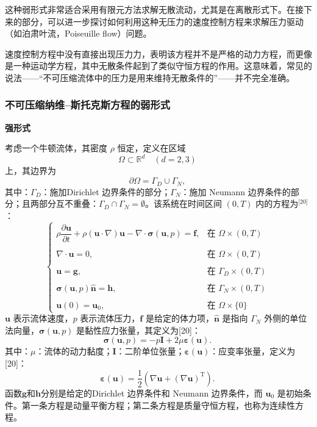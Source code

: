 这种弱形式非常适合采用有限元方法求解无散流动，尤其是在离散形式下。在接下来的部分，可以进一步探讨如何利用这种无压力的速度控制方程来求解压力驱动（如泊肃叶流，Poiseuille flow）问题。

速度控制方程中没有直接出现压力力，表明该方程并不是严格的动力方程，而更像是一种运动学方程，其中无散条件起到了类似守恒方程的作用。这意味着，常见的说法——“不可压缩流体中的压力是用来维持无散条件的”——并不完全准确。
\subsubsection{不可压缩纳维–斯托克斯方程的弱形式}
\textbf{强形式}

考虑一个牛顿流体，其密度 $\rho$ 恒定，定义在区域
$$
\Omega \subset \mathbb{R}^d \quad (d = 2, 3)~
$$
上，其边界为
$$
\partial \Omega = \Gamma_D \cup \Gamma_N,~
$$
其中：$\Gamma_D$：施加Dirichlet 边界条件的部分；$\Gamma_N$：施加 Neumann 边界条件的部分；且两部分互不重叠：$\Gamma_D \cap \Gamma_N = \emptyset$。该系统在时间区间 $(0, T)$ 内的方程为\(^\text{[20]}\)：
$$
\begin{cases}
\rho \dfrac{\partial \mathbf{u}}{\partial t}
+ \rho (\mathbf{u} \cdot \nabla)\mathbf{u}
- \nabla \cdot \boldsymbol{\sigma}(\mathbf{u}, p)
= \mathbf{f},
& \text{在 } \Omega \times (0, T) \\[6pt]\\
\nabla \cdot \mathbf{u} = 0,
& \text{在 } \Omega \times (0, T) \\[6pt]\\
\mathbf{u} = \mathbf{g},
& \text{在 } \Gamma_D \times (0, T) \\[6pt]\\
\boldsymbol{\sigma}(\mathbf{u}, p) \hat{\mathbf{n}} = \mathbf{h},
& \text{在 } \Gamma_N \times (0, T) \\[6pt]\\
\mathbf{u}(0) = \mathbf{u}_0,
& \text{在 } \Omega \times \{0\}
\end{cases}~
$$
$\mathbf{u}$ 表示流体速度，$p$ 表示流体压力，$\mathbf{f}$ 是给定的体力项，$\hat{\mathbf{n}}$ 是指向 $\Gamma_N$ 外侧的单位法向量，$\boldsymbol{\sigma}(\mathbf{u}, p)$ 是黏性应力张量，其定义为[20]：
$$
\boldsymbol{\sigma}(\mathbf{u}, p)
= -p\mathbf{I} + 2\mu \boldsymbol{\varepsilon}(\mathbf{u}).~
$$
其中：$\mu$：流体的动力黏度；$\mathbf{I}$：二阶单位张量；$\boldsymbol{\varepsilon}(\mathbf{u})$：应变率张量，定义为[20]：
$$
\boldsymbol{\varepsilon}(\mathbf{u})
= \frac{1}{2}
\left(
\nabla \mathbf{u}
+ (\nabla \mathbf{u})^{\mathrm{T}}
\right).~
$$
函数$\mathbf{g}$和$\mathbf{h}$分别是给定的Dirichlet 边界条件和 Neumann 边界条件，而 $\mathbf{u}_0$ 是初始条件。第一条方程是动量平衡方程；第二条方程是质量守恒方程，也称为连续性方程。

